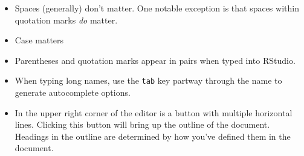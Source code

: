 \documentclass[]{article}
\begin{document}
\begin{itemize}
\item
  Spaces (generally) don't matter. One notable exception is that spaces
  within quotation marks \emph{do} matter.
\item
  Case matters
\item
  Parentheses and quotation marks appear in pairs when typed into
  RStudio.
\item
  When typing long names, use the \texttt{tab} key partway through the
  name to generate autocomplete options.
\item
  In the upper right corner of the editor is a button with multiple
  horizontal lines. Clicking this button will bring up the outline of
  the document. Headings in the outline are determined by how you've
  defined them in the document.
\end{itemize}
\end{document}

